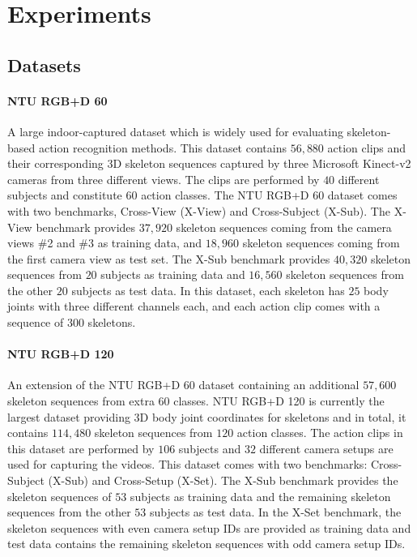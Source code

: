 \documentclass[journal]{IEEEtran}
\theoremstyle{definition}
\begin{document}
\section{Experiments} \label{sec:experiments}

\subsection{Datasets} \label{sec:datasets}
\paragraph{NTU RGB+D 60~\textnormal{\cite{Shahroudy_2016_NTURGBD}}}
A large indoor-captured dataset which is widely used for evaluating skeleton-based action recognition methods. This dataset contains $56{,}880$ action clips and their corresponding $3$D skeleton sequences captured by three Microsoft Kinect-v2 cameras from three different views. The clips are performed by $40$ different subjects and constitute $60$ action classes. The NTU RGB+D 60 dataset comes with two benchmarks, Cross-View (X-View) and Cross-Subject (X-Sub). The X-View benchmark provides $37{,}920$ skeleton sequences coming from the camera views \#2 and \#3 as training data, and $18{,}960$ skeleton sequences coming from the first camera view as test set. The X-Sub benchmark provides $40{,}320$ skeleton sequences from $20$ subjects as training data and $16{,}560$ skeleton sequences from the other $20$ subjects as test data. In this dataset, each skeleton has $25$ body joints with three different channels each, and each action clip comes with a sequence of $300$ skeletons. 

\paragraph{NTU RGB+D 120~\textnormal{\cite{Liu_2019_NTURGBD120}}}
An extension of the NTU RGB+D 60 dataset containing an additional $57{,}600$ skeleton sequences from extra $60$ classes. NTU RGB+D 120 is currently the largest dataset providing $3$D body joint coordinates for skeletons and in total, it contains $114{,}480$ skeleton sequences from $120$ action classes. The action clips in this dataset are performed by $106$ subjects and $32$ different camera setups are used for capturing the videos. This dataset comes with two benchmarks: Cross-Subject (X-Sub) and Cross-Setup (X-Set). The X-Sub benchmark provides the skeleton sequences of $53$ subjects as training data and the remaining skeleton sequences from the other $53$ subjects as test data. 
In the X-Set benchmark, the skeleton sequences with even camera setup IDs are provided as training data and test data contains the remaining skeleton sequences with odd camera setup IDs.
\end{document}
